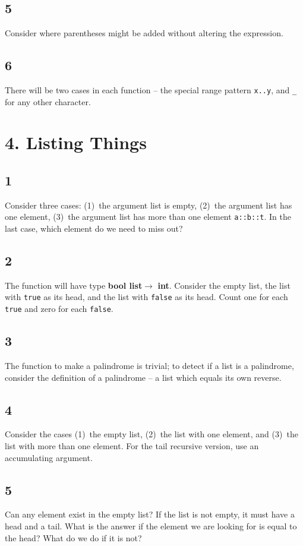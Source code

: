 \documentclass[]{book}
\begin{document}
\subsection*{5}
Consider where parentheses might be added without altering the expression.
\subsection*{6}
There will be two cases in each function -- the special range pattern \texttt{x..y}, and \texttt{\_} for any other character.

\section*{4. Listing Things}
\subsection*{1}
Consider three cases: (1)~the argument list is empty, (2)~the argument list has one element, (3)~the argument list has more than one element \texttt{a::b::t}. In the last case, which element do we need to miss out?
\subsection*{2}
The function will have type \textsf{\textbf{bool list}}$ \rightarrow$ \textsf{\textbf{int}}. Consider the empty list, the list with \texttt{true} as its head, and the list with \texttt{false} as its head. Count one for each \texttt{true} and zero for each \texttt{false}.
\subsection*{3}
The function to make a palindrome is trivial; to detect if a list is a palindrome, consider the definition of a palindrome -- a list which equals its own reverse.
\subsection*{4}
Consider the cases (1)~the empty list, (2)~the list with one element, and (3)~the list with more than one element. For the tail recursive version, use an accumulating argument.
\subsection*{5}
Can any element exist in the empty list? If the list is not empty, it must have a head and a tail. What is the answer if the element we are looking for is equal to the head? What do we do if it is not?
\end{document}
